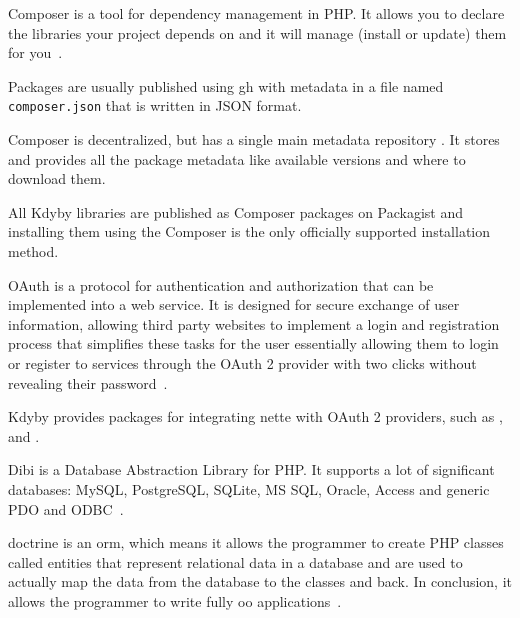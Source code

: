  \label{sec:theory:composer}

Composer is a tool for dependency management in PHP. It allows you to declare the libraries your project depends on and it will manage (install or update) them for you~\cite{composer:docs:intro}.

Packages are usually published using \gls{gh} with metadata in a file named \lstinline{composer.json} that is written in JSON format.

Composer is decentralized, but has a single main metadata repository . It stores and provides all the package metadata like available versions and where to download them.

All Kdyby libraries are published as Composer packages on Packagist and installing them using the Composer is the only officially supported installation method.

 \label{sec:theory:oauth2}

OAuth is a protocol for authentication and authorization that can be implemented into a web service. It is designed for secure exchange of user information, allowing third party websites to implement a login and registration process that simplifies these tasks for the user essentially allowing them to login or register to services through the OAuth 2 provider with two clicks without revealing their password~\cite{boyd2012getting}.

Kdyby provides packages for integrating \gls{nette} with OAuth 2 providers, such as ,  and .

 \label{sec:theory:dibi}

Dibi is a Database Abstraction Library for PHP. It supports a lot of significant databases: MySQL, PostgreSQL, SQLite, MS SQL, Oracle, Access and generic PDO and ODBC~\cite{dibi:homepage}.

 \label{sec:theory:doctrine}

\gls{doctrine} is an \gls{orm}, which means it allows the programmer to create PHP classes called entities that represent relational data in a database and are used to actually map the data from the database to the classes and back. In conclusion, it allows the programmer to write fully \gls{oo} applications~\cite{fowler2002patterns}.

